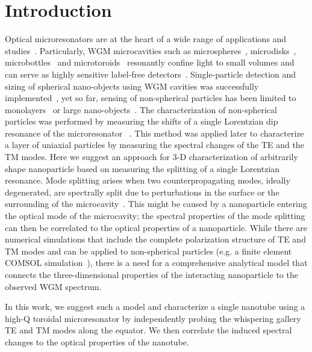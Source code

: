 \documentclass[journal=jacsat,manuscript=article]{achemso}
\begin{document}
\section{Introduction}
Optical microresonators are at the heart of a wide range of applications and studies~\cite{vahala2003optical}. Particularly, WGM microcavities such as microspheres~\cite{arnold2003shift,vernooy1998high}, microdisks~\cite{savchenkov2004kilohertz}, microbottles~\cite{louyer2005tunable} and microtoroids~\cite{armani2003} resonantly confine light to small volumes and can serve as highly sensitive label-free detectors~\cite{vollmer2008whispering,vollmer2012}. Single-particle detection and sizing of spherical nano-objects using WGM cavities was successfully implemented~\cite{vollmer2008single,zhu2010,lu2011,dantham2012}, yet so far, sensing of non-spherical particles has been limited to monolayers~\cite{noto2007,topolancik2007photoinduced} or large nano-objects~\cite{ren2007highQ,kim2012detection}. The characterization of non-spherical particles was performed by measuring the shifts of a single Lorentzian dip resonance of the microresonator ~\cite{arnold2003shift}. This method was applied later to characterize a layer of uniaxial particles by measuring the spectral changes of the TE and the TM modes. Here we suggest an approach for 3-D characterization of arbitrarily shape nanoparticle based on measuring the splitting of a single Lorentzian resonance. Mode splitting arises when two counterpropagating modes, ideally degenerated, are spectrally split due to perturbations in the surface or the surrounding of the microcavity~\cite{Haroche1995splitting,Kippenberg:02,zhu2010,kim2010}. This might be caused by a nanoparticle entering the optical mode of the microcavity; the spectral properties of the mode splitting can then be correlated to the optical properties of a nanoparticle.
While there are numerical simulations that include the complete polarization structure of TE and TM modes and can be applied to non-spherical particles (e.g. a finite element COMSOL simulation~\cite{kaplan2013finite}), there is a need for a comprehensive analytical model that connects the three-dimensional properties of the interacting nanoparticle to the observed WGM spectrum.

In this work, we suggest such a model and characterize a single  nanotube using a high-Q toroidal microresonator by independently probing the whispering gallery TE and TM modes along the equator. We then correlate the induced spectral changes to the optical properties of the nanotube.
\end{document}
